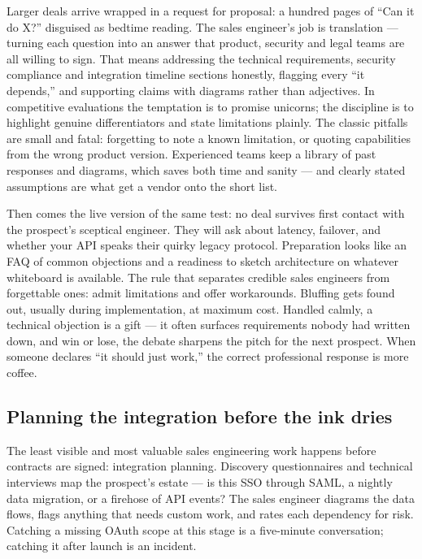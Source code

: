 Larger deals arrive wrapped in a request for proposal: a hundred pages of ``Can it do X?'' disguised as bedtime reading. The sales engineer's job is translation — turning each question into an answer that product, security and legal teams are all willing to sign. That means addressing the technical requirements, security compliance and integration timeline sections honestly, flagging every ``it depends,'' and supporting claims with diagrams rather than adjectives. In competitive evaluations the temptation is to promise unicorns; the discipline is to highlight genuine differentiators and state limitations plainly. The classic pitfalls are small and fatal: forgetting to note a known limitation, or quoting capabilities from the wrong product version. Experienced teams keep a library of past responses and diagrams, which saves both time and sanity — and clearly stated assumptions are what get a vendor onto the short list.


Then comes the live version of the same test: no deal survives first contact with the prospect's sceptical engineer. They will ask about latency, failover, and whether your API speaks their quirky legacy protocol. Preparation looks like an FAQ of common objections and a readiness to sketch architecture on whatever whiteboard is available. The rule that separates credible sales engineers from forgettable ones: admit limitations and offer workarounds. Bluffing gets found out, usually during implementation, at maximum cost. Handled calmly, a technical objection is a gift — it often surfaces requirements nobody had written down, and win or lose, the debate sharpens the pitch for the next prospect. When someone declares ``it should just work,'' the correct professional response is more coffee.



\subsection{Planning the integration before the ink dries}


The least visible and most valuable sales engineering work happens before contracts are signed: integration planning. Discovery questionnaires and technical interviews map the prospect's estate — is this SSO through SAML, a nightly data migration, or a firehose of API events? The sales engineer diagrams the data flows, flags anything that needs custom work, and rates each dependency for risk. Catching a missing OAuth scope at this stage is a five-minute conversation; catching it after launch is an incident.



